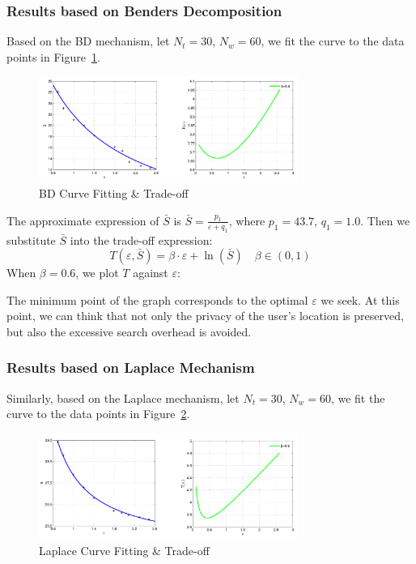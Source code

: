 \subsubsection{Results based on Benders Decomposition}
Based on the BD mechanism, let $N_t=30$, $N_w=60$, we fit the curve to the data points in Figure~\ref{img:CurveBD}.

\begin{figure}
\includegraphics[width=8.5cm]{CurveBD}
\caption{BD Curve Fitting \& Trade-off}
\label{img:CurveBD}
\end{figure}

The approximate expression of $\bar{S}$ is $\bar{S}=\frac{p_1}{\varepsilon + q_1}$, where $p_1=43.7$, $q_1=1.0$. Then we substitute $\bar{S}$ into the trade-off expression:
$$
	T(\varepsilon , \bar{S})=\beta \cdot \varepsilon + \ln (\bar{S}) \quad \beta \in (0,1)
$$
When $\beta=0.6$, we plot $T$ against $\varepsilon$:

The minimum point of the graph corresponds to the optimal $\varepsilon$ we seek. At this point, we can think that not only the privacy of the user's location is preserved, but also the excessive search overhead is avoided. 

\subsubsection{Results based on Laplace Mechanism}
Similarly, based on the Laplace mechanism, let $N_t=30$, $N_w=60$, we fit the curve to the data points in Figure~\ref{img:CurveLP}.

\begin{figure}
\includegraphics[width=8.5cm]{CurveLP}
\caption{Laplace Curve Fitting \& Trade-off}
\label{img:CurveLP}
\end{figure}

